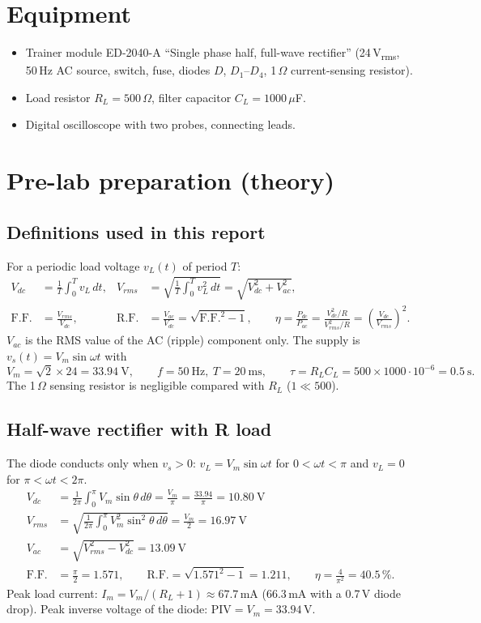 \documentclass[11pt,a4paper]{article}
\begin{document}
\section{Equipment}
\begin{itemize}[nosep]
\item Trainer module ED-2040-A ``Single phase half, full-wave rectifier''
      (24\,V\textsubscript{rms}, 50\,Hz AC source, switch, fuse, diodes $D$, $D_1$--$D_4$,
      1\,$\Omega$ current-sensing resistor).
\item Load resistor $R_L = 500\,\Omega$, filter capacitor $C_L = 1000\,\mu$F.
\item Digital oscilloscope with two probes, connecting leads.
\end{itemize}

\section{Pre-lab preparation (theory)}
\subsection{Definitions used in this report}
For a periodic load voltage $v_L(t)$ of period $T$:
\begin{align*}
V_{dc} &= \frac{1}{T}\int_0^T v_L\,dt, &
V_{rms} &= \sqrt{\frac{1}{T}\int_0^T v_L^2\,dt}=\sqrt{V_{dc}^2+V_{ac}^2},\\
\text{F.F.} &= \frac{V_{rms}}{V_{dc}}, &
\text{R.F.} &= \frac{V_{ac}}{V_{dc}}=\sqrt{\text{F.F.}^2-1}, \qquad
\eta = \frac{P_{dc}}{P_{ac}}=\frac{V_{dc}^2/R}{V_{rms}^2/R}=\left(\frac{V_{dc}}{V_{rms}}\right)^2 .
\end{align*}
$V_{ac}$ is the RMS value of the AC (ripple) component only.
The supply is $v_s(t)=V_m\sin\omega t$ with
\[
V_m=\sqrt2\times24 = 33.94\ \text{V},\qquad f=50\ \text{Hz},\ T=20\ \text{ms},\qquad
\tau = R_LC_L = 500\times1000\cdot10^{-6}=0.5\ \text{s}.
\]
The 1\,$\Omega$ sensing resistor is negligible compared with $R_L$ ($1\ll500$).

\subsection{Half-wave rectifier with R load}
The diode conducts only when $v_s>0$:
$v_L=V_m\sin\omega t$ for $0<\omega t<\pi$ and $v_L=0$ for $\pi<\omega t<2\pi$.
\begin{align*}
V_{dc}&=\frac{1}{2\pi}\int_0^{\pi}V_m\sin\theta\,d\theta=\frac{V_m}{\pi}=\frac{33.94}{\pi}=10.80\ \text{V}\\
V_{rms}&=\sqrt{\frac{1}{2\pi}\int_0^{\pi}V_m^2\sin^2\theta\,d\theta}=\frac{V_m}{2}=16.97\ \text{V}\\
V_{ac}&=\sqrt{V_{rms}^2-V_{dc}^2}=13.09\ \text{V}\\
\text{F.F.}&=\frac{\pi}{2}=1.571,\qquad \text{R.F.}=\sqrt{1.571^2-1}=1.211,\qquad
\eta=\frac{4}{\pi^2}=40.5\,\%.
\end{align*}
Peak load current: $I_m=V_m/(R_L+1)\approx 67.7$\,mA (66.3\,mA with a 0.7\,V diode drop).
Peak inverse voltage of the diode: $\text{PIV}=V_m=33.94$\,V.
\end{document}
